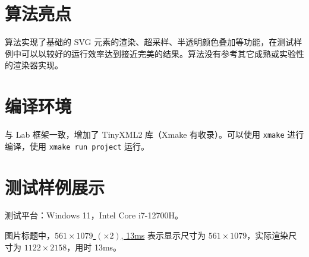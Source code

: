 \documentclass[UTF8]{ctexart}
\begin{document}
\section{算法亮点}

算法实现了基础的 SVG 元素的渲染、超采样、半透明颜色叠加等功能，在测试样例中可以以较好的运行效率达到接近完美的结果。算法没有参考其它成熟或实验性的渲染器实现。

\section{编译环境}

与 Lab 框架一致，增加了 TinyXML2 库（Xmake 有收录）。可以使用 \texttt{xmake} 进行编译，使用 \texttt{xmake run project} 运行。

\section{测试样例展示}

测试平台：Windows 11，Intel Core i7-12700H。

图片标题中，\underline{$561 \times 1079$ $(\times 2)$, 13ms} 表示显示尺寸为 $561 \times 1079$，实际渲染尺寸为 $1122 \times 2158$，用时 13ms。
\end{document}
